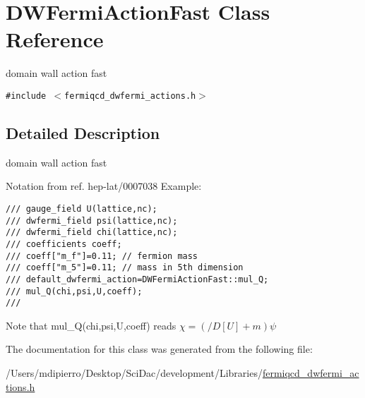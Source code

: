 \hypertarget{class_d_w_fermi_action_fast}{
\section{DWFermiActionFast Class Reference}
\label{class_d_w_fermi_action_fast}
}
domain wall action fast  


{\tt \#include $<$fermiqcd\_\-dwfermi\_\-actions.h$>$}



\subsection{Detailed Description}
domain wall action fast 

Notation from ref. hep-lat/0007038 Example: 

\footnotesize\begin{verbatim}
/// gauge_field U(lattice,nc);
/// dwfermi_field psi(lattice,nc);
/// dwfermi_field chi(lattice,nc);
/// coefficients coeff;
/// coeff["m_f"]=0.11; // fermion mass
/// coeff["m_5"]=0.11; // mass in 5th dimension
/// default_dwfermi_action=DWFermiActionFast::mul_Q;
/// mul_Q(chi,psi,U,coeff);
/// \end{verbatim}
\normalsize
 Note that mul\_\-Q(chi,psi,U,coeff) reads $ \chi=(/\!\!\!D[U]+m)\psi $ 

The documentation for this class was generated from the following file:\begin{CompactItemize}
\item 
/Users/mdipierro/Desktop/SciDac/development/Libraries/\hyperlink{fermiqcd__dwfermi__actions_8h}{fermiqcd\_\-dwfermi\_\-actions.h}\end{CompactItemize}
